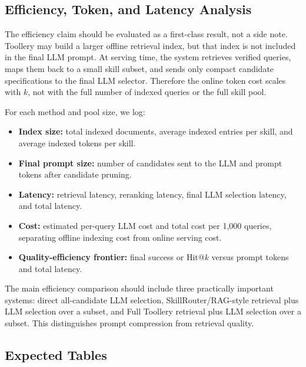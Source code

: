 \documentclass[11pt]{article}
\begin{document}
\subsection{Efficiency, Token, and Latency Analysis}
\label{subsec:efficiency}

The efficiency claim should be evaluated as a first-class result, not a side
note. Toollery may build a larger offline retrieval index, but that index is not
included in the final LLM prompt. At serving time, the system retrieves verified
queries, maps them back to a small skill subset, and sends only compact
candidate specifications to the final LLM selector. Therefore the online token
cost scales with $k$, not with the full number of indexed queries or the full
skill pool.

For each method and pool size, we log:
\begin{itemize}
    \item \textbf{Index size:} total indexed documents, average indexed entries
    per skill, and average indexed tokens per skill.
    \item \textbf{Final prompt size:} number of candidates sent to the LLM and
    prompt tokens after candidate pruning.
    \item \textbf{Latency:} retrieval latency, reranking latency, final LLM
    selection latency, and total latency.
    \item \textbf{Cost:} estimated per-query LLM cost and total cost per 1,000
    queries, separating offline indexing cost from online serving cost.
    \item \textbf{Quality-efficiency frontier:} final success or Hit@$k$ versus
    prompt tokens and total latency.
\end{itemize}

The main efficiency comparison should include three practically important
systems: direct all-candidate LLM selection, SkillRouter/RAG-style retrieval plus
LLM selection over a subset, and Full Toollery retrieval plus LLM selection over
a subset. This distinguishes prompt compression from retrieval quality.

\subsection{Expected Tables}
\label{subsec:expected-tables}
\end{document}
